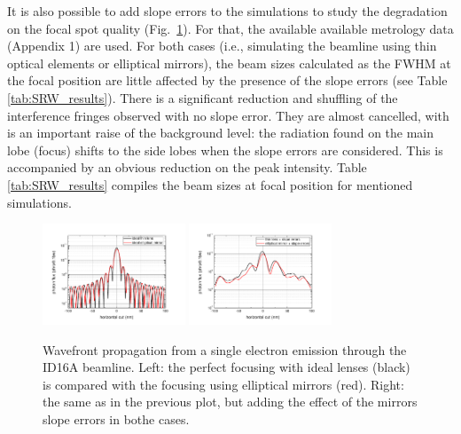 \documentclass{iucr}              %
\newcommand{\inred}[1]{{\color{red}#1}}
\begin{document}
It is also possible to add slope errors to the simulations to study the degradation on the focal spot quality (Fig.~\ref{fig:SingleElectron}). For that, the available available metrology data \inred{(Appendix 1)} are used. For both cases (i.e., simulating the beamline using thin optical elements or elliptical mirrors), the beam sizes calculated as the FWHM at the focal position are little affected by the presence of the slope errors (see Table \ref{tab:SRW_results}). There is a significant reduction and shuffling of the interference fringes observed with no slope error. They are almost cancelled, with is an important raise of the background level: the radiation found on the main lobe (focus) shifts to the side lobes when the slope errors are considered. This is accompanied by an obvious reduction on the peak intensity. Table \ref{tab:SRW_results} compiles the beam sizes at focal position for mentioned simulations.

\begin{figure}
    \centering
        \includegraphics[width=4.25cm]{GRAPHICS/se_idealTE_idealOE_h.pdf}
        \includegraphics[width=4.25cm]{GRAPHICS/ebs_slopeTE_slopeOE_h.pdf}
    \label{fig:SingleElectron}
    \caption{Wavefront propagation from a single electron emission through the ID16A beamline. Left: the perfect focusing with ideal lenses (black) is compared with the focusing using elliptical mirrors (red). Right: the same as in the previous plot, but adding the effect of the mirrors slope errors in bothe cases.}
\end{figure}
\end{document}

